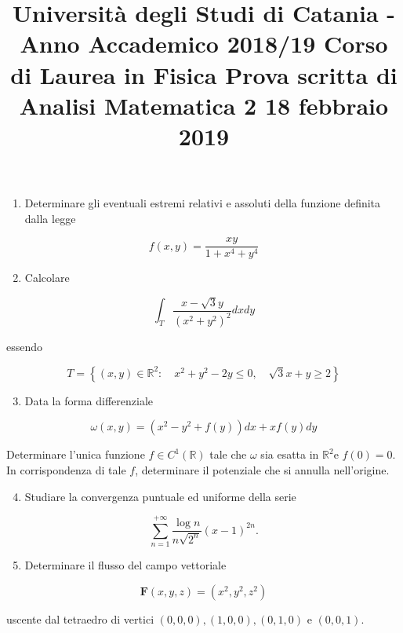 \documentclass[10pt]{article}
\title{Università degli Studi di Catania - Anno Accademico 2018/19 
 Corso di Laurea in Fisica 
 Prova scritta di Analisi Matematica 2 
 18 febbraio 2019 }
\author{}
\date{}
\begin{document}
\maketitle
\begin{enumerate}
  \item Determinare gli eventuali estremi relativi e assoluti della funzione definita dalla legge
\end{enumerate}

\[
f(x, y)=\frac{x y}{1+x^{4}+y^{4}}
\]

\begin{enumerate}
  \setcounter{enumi}{1}
  \item Calcolare
\end{enumerate}

\[
\int_{T} \frac{x-\sqrt{3} y}{\left(x^{2}+y^{2}\right)^{2}} d x d y
\]

essendo

\[
T=\left\{(x, y) \in \mathbb{R}^{2}: \quad x^{2}+y^{2}-2 y \leq 0, \quad \sqrt{3} x+y \geq 2\right\}
\]

\begin{enumerate}
  \setcounter{enumi}{2}
  \item Data la forma differenziale
\end{enumerate}

\[
\omega(x, y)=\left(x^{2}-y^{2}+f(y)\right) d x+x f(y) d y
\]

Determinare l'unica funzione \(f \in C^{1}(\mathbb{R})\) tale che \(\omega\) sia esatta in \(\mathbb{R}^{2} \mathrm{e}\) \(f(0)=0\). In corrispondenza di tale \(f\), determinare il potenziale che si annulla nell'origine.

\begin{enumerate}
  \setcounter{enumi}{3}
  \item Studiare la convergenza puntuale ed uniforme della serie
\end{enumerate}

\[
\sum_{n=1}^{+\infty} \frac{\log n}{n \sqrt{2^{n}}}(x-1)^{2 n} .
\]

\begin{enumerate}
  \setcounter{enumi}{4}
  \item Determinare il flusso del campo vettoriale
\end{enumerate}

\[
\mathbf{F}(x, y, z)=\left(x^{2}, y^{2}, z^{2}\right)
\]

uscente dal tetraedro di vertici \((0,0,0),(1,0,0),(0,1,0)\) e \((0,0,1)\).
\end{document}
